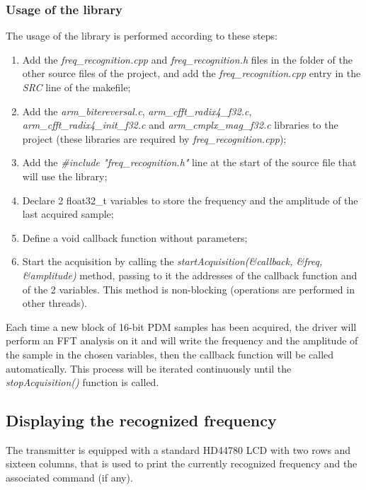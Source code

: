 \subsubsection{Usage of the library}
The usage of the library is performed according to these steps:
\begin{enumerate}
	\item Add the \textit{freq\_recognition.cpp} and \textit{freq\_recognition.h} files in the folder of the other source files of the project, and add the \textit{freq\_recognition.cpp} entry in the \textit{SRC} line of the makefile;
	\item Add the \textit{arm\_bitereversal.c}, \textit{arm\_cfft\_radix4\_f32.c}, \textit{arm\_cfft\_radix4\_init\_f32.c} and \textit{arm\_cmplx\_mag\_f32.c} libraries to the project (these libraries are required by \textit{freq\_recognition.cpp});
	\item Add the \textit{\#include "freq\_recognition.h"} line at the start of the source file that will use the library;
	\item Declare 2 float32\_t variables to store the frequency and the amplitude of the last acquired sample;
	\item Define a void callback function without parameters;
	\item Start the acquisition by calling the \textit{startAcquisition(\&callback, \&freq, \&amplitude)} method, passing to it the addresses of the callback function and of the 2 variables. This method is non-blocking (operations are performed in other threads).
\end{enumerate}
Each time a new block of 16-bit PDM samples has been acquired, the driver will perform an FFT analysis on it and will write the frequency and the amplitude of the sample in the chosen variables, then the callback function will be called automatically. This process will be iterated continuously until the \textit{stopAcquisition()} function is called.
\newpage

\subsection{Displaying the recognized frequency}
The transmitter is equipped with a standard HD44780 LCD with two rows and sixteen columns, that is used to print the currently recognized frequency and the associated command (if any).

